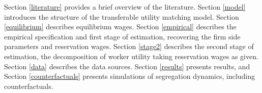 \documentclass[11pt]{article}
\begin{document}
 
Section \ref{literature} provides a brief overview of the literature. Section \ref{model} introduces the structure of the transferable utility matching model. Section \ref{equilibrium} describes equilibrium wages. Section \ref{empirical} describes the empirical specification and first stage of estimation, recovering the firm side parameters and reservation wages. Section \ref{stage2} describes the second stage of estimation, the decomposition of worker utility taking reservation wages as given. Section \ref{data} describes the data sources. Section \ref{results} presents results, and Section \ref{counterfactuals} presents simulations of segregation dynamics, including counterfactuals.


\end{document}

